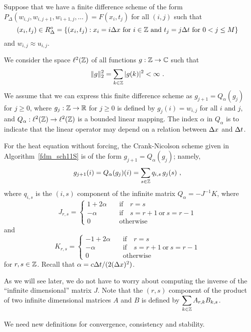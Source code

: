 Suppose that we have a finite difference scheme of the form
$P_\Delta(w_{i,j},w_{i,j+1},w_{i+1,j}, \ldots) = F(x_i,t_j)$ for all
$(i,j)$ such that
\[
(x_i,t_j) \in R^o_\Delta = \left\{ (x_i,t_j) : x_i = i \Delta{x} \ \text{for} \
i \in \mathbb{Z} \ \text{and} \ t_j = j \Delta{t} \ \text{for} \ 0 < j \leq M \right\}
\]
and $w_{i,j} \approx u_{i,j}$.

We consider the space $\ell^2(\mathbb{Z})$ of all functions $g:\mathbb{Z} \to \mathbb{C}$
such that
\[
  \|g\|_2^2 = \sum_{k\in \mathbb{Z}} |g(k)|^2 < \infty \ .
\]
We assume that we can express this finite difference scheme as
$g_{j+1} = Q_\alpha(g_j)$ for $j \geq 0$, where
$g_j:\mathbb{Z} \to \mathbb{R}$ for $j\geq 0$ is defined by
$g_j(i) = w_{i,j}$ for all $i$ and $j$, and
$Q_\alpha:\ell^2(\mathbb{Z}) \to \ell^2(\mathbb{Z})$ is
a bounded linear mapping.  The index $\alpha$ in
$Q_\alpha$ is to indicate that the linear operator may depend on a
relation between $\Delta{x}$ and $\Delta{t}$.

\begin{egg}
For the heat equation without forcing, the Crank-Nicolson
scheme given in Algorithm~\ref{fdm_sch11S} is of the form
$g_{j+1} = Q_\alpha(g_j)$; namely,
\[
  g_{j+1}(i) = Q_\alpha(g_j)(i) = \sum_{s\in \mathbb{Z}} q_{i,s}\, g_j(s) \ ,
\]
where $q_{i,s}$ is the $(i,s)$ component of the infinite matrix
$Q_\alpha = -J^{-1} K$, where
\[
J_{r,s} =
\begin{cases}
1 + 2 \alpha & \quad \text{if} \quad r = s \\
-\alpha & \quad \text{if} \quad s = r + 1 \ \text{or} \ s = r - 1\\
0 & \quad \text{otherwise}
\end{cases}
\]
and
\[
K_{r,s} =
\begin{cases}
-1 + 2 \alpha & \quad \text{if} \quad r = s \\
-\alpha & \quad \text{if} \quad s=r+1 \ \text{or} \ s = r - 1\\
0 & \quad \text{otherwise}
\end{cases}
\]
for $r,s \in \mathbb{Z}$.  Recall that $\alpha = c \Delta{t} / (2 (\Delta{x})^2)$.

As we will see later, we do not have to worry
about computing the inverse of the ``infinite dimensional'' matrix
$J$.  Note that the $(r,s)$ component of the product of two infinite
dimensional matrices $A$ and $B$ is defined by
$\displaystyle \sum_{k\in \mathbb{Z}} A_{r,k}B_{k,s}$.
\label{ell2CNegg1}
\end{egg}

We need new definitions for convergence, consistency and stability.

